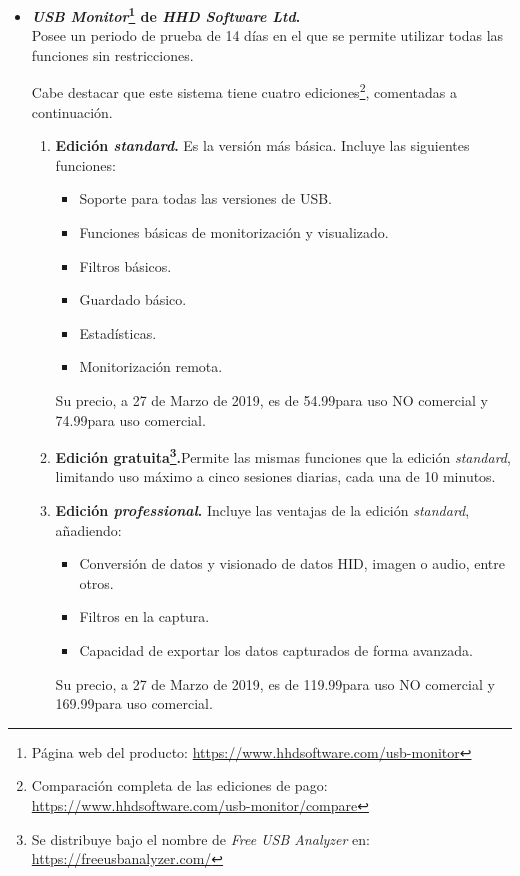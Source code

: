 \begin{itemize}
    \item \textbf{\emph{USB Monitor}\footnote{Página web del producto: \url{https://www.hhdsoftware.com/usb-monitor}} de \emph{HHD Software Ltd}.} \\
    Posee un periodo de prueba de 14 días en el que se permite utilizar todas las funciones sin restricciones.

    Cabe destacar que este sistema tiene cuatro ediciones\footnote{Comparación completa de las ediciones de pago: \url{https://www.hhdsoftware.com/usb-monitor/compare}}, comentadas a continuación.
    \begin{enumerate}
        \item \textbf{Edición \emph{standard}.} Es la versión más básica. Incluye las siguientes funciones:
        \begin{itemize}
            \item Soporte para todas las versiones de USB.
            \item Funciones básicas de monitorización y visualizado.
            \item Filtros básicos.
            \item Guardado básico.
            \item Estadísticas.
            \item Monitorización remota.
        \end{itemize}
        Su precio, a 27 de Marzo de 2019, es de 54.99\texteuro para uso NO comercial y 74.99\texteuro para uso comercial.

        \item \textbf{Edición gratuita\footnote{Se distribuye bajo el nombre de \emph{Free USB Analyzer} en: \url{https://freeusbanalyzer.com/}}.}Permite las mismas funciones que la edición \emph{standard}, limitando uso máximo a cinco sesiones diarias, cada una de 10 minutos.
        
        \item \textbf{Edición \emph{professional}.} Incluye las ventajas de la edición \emph{standard}, añadiendo:
        \begin{itemize}
            \item Conversión de datos y visionado de datos HID, imagen o audio, entre otros.
            \item Filtros en la captura.
            \item Capacidad de exportar los datos capturados de forma avanzada.
        \end{itemize}
        Su precio, a 27 de Marzo de 2019, es de 119.99\texteuro para uso NO comercial y 169.99\texteuro para uso comercial.
        

\end{enumerate}
\end{itemize}
